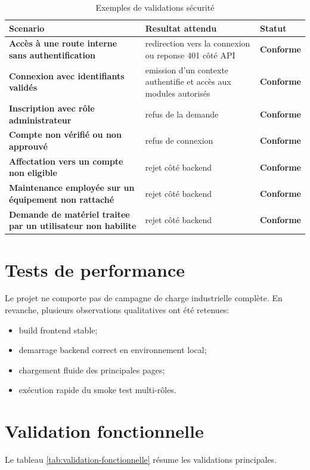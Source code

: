 ﻿\documentclass[12pt,a4paper,oneside]{report}
\begin{document}
\begin{table}[H]
\centering
\caption{Exemples de validations sécurité}
\label{tab:tests-securite}
\begin{tabularx}{\textwidth}{>{\bfseries}p{4cm}X>{\bfseries}p{2cm}}
\toprule
Scenario & Resultat attendu & Statut \\
\midrule
Accès à une route interne sans authentification & redirection vers la connexion ou reponse 401 côté API & Conforme \\
Connexion avec identifiants validés & emission d'un contexte authentifie et accès aux modules autorisés & Conforme \\
Inscription avec rôle administrateur & refus de la demande & Conforme \\
Compte non vérifié ou non approuvé & refus de connexion & Conforme \\
Affectation vers un compte non eligible & rejet côté backend & Conforme \\
Maintenance employée sur un équipement non rattaché & rejet côté backend & Conforme \\
Demande de matériel traitee par un utilisateur non habilite & rejet côté backend & Conforme \\
\bottomrule
\end{tabularx}
\end{table}

\section{Tests de performance}
Le projet ne comporte pas de campagne de charge industrielle complète. En revanche, plusieurs observations qualitatives ont été retenues:
\begin{itemize}
  \item build frontend stable;
  \item demarrage backend correct en environnement local;
  \item chargement fluide des principales pages;
  \item exécution rapide du smoke test multi-rôles.
\end{itemize}

\section{Validation fonctionnelle}
Le tableau \ref{tab:validation-fonctionnelle} résume les validations principales.
\end{document}
